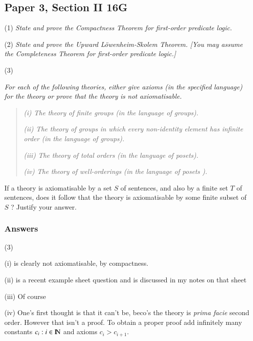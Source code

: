 \documentclass{book}
\begin{document}
\subsection*{Paper 3, Section II 16G}


(1) {\sl State and prove the Compactness Theorem for first-order predicate
logic.}

\noindent (2) {\sl State and prove the Upward L\"owenheim-Skolem
Theorem.  [You may assume the Completeness Theorem for first-order predicate logic.]}

\noindent (3) {\sl For each of the following theories, either give
  axioms (in the specified language) for the theory or prove that the
  theory is not axiomatisable.



\begin{quote}
{\sl (i) The theory of finite groups (in the language of groups).}

{\sl (ii) The theory of groups in which every non-identity element has
infinite order (in the language of groups).}

{\sl (iii) The theory of total orders (in the language of posets).}

{\sl (iv) The theory of well-orderings (in the language of posets ).}
\end{quote}

If a theory is axiomatisable by a set $S$ of sentences, and also
by a finite set $T$ of sentences, does it follow that the theory
is axiomatisable by some finite subset of $S$ ?  Justify your answer.}

\subsubsection*{Answers}

(3)

(i) is clearly not axiomatisable, by compactness.

\smallskip

(ii) is a recent example sheet question and is discussed in my notes on that sheet

\smallskip

(iii) Of course

\smallskip

(iv) One's first thought is that it can't be, beco's the theory is
{\sl prima facie} second order. However that isn't a proof.  To obtain
a proper proof add infinitely many constants $c_i: i \in \hbox{\rm I\negthinspace N}$ and
axioms $c_i > c_{i+1}$.
\end{document}
